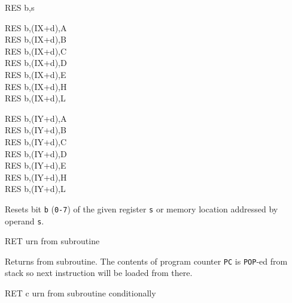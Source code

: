 \documentclass[12pt,twoside,openright,a4paper]{book}
\begin{document}
\begin{basedescript}{
	\desclabelstyle{\multilinelabel}
	\desclabelwidth{3cm}}
\begin{DetailItem}{RES b,s}
\begin{DetailVariants}
			\columnbreak
			RES b,(IX+d),A\UNDOC\\
			RES b,(IX+d),B\UNDOC\\
			RES b,(IX+d),C\UNDOC\\
			RES b,(IX+d),D\UNDOC\\
			RES b,(IX+d),E\UNDOC\\
			RES b,(IX+d),H\UNDOC\\
			RES b,(IX+d),L\UNDOC

			\columnbreak
			RES b,(IY+d),A\UNDOC\\
			RES b,(IY+d),B\UNDOC\\
			RES b,(IY+d),C\UNDOC\\
			RES b,(IY+d),D\UNDOC\\
			RES b,(IY+d),E\UNDOC\\
			RES b,(IY+d),H\UNDOC\\
			RES b,(IY+d),L\UNDOC
		\end{DetailVariants}

		Resets bit {\tt b} ({\tt 0-7}) of the given register {\tt s} or memory location addressed by operand {\tt s}.

		\begin{DetailEffects}
			\FlagsRESr
		\end{DetailEffects}
						
		\begin{DetailTiming}
			\DetailTime[r]{2}{8}
			\DetailTime[(HL)]{4}{15}
			\DetailTime[(IX+d)]{6}{23}
			\DetailTime[(IY+d)]{6}{23}
		\end{DetailTiming}

	\end{DetailItem}

	\pagebreak
	\begin{DetailItem}{RET}
		{urn from subroutine}
		{\SymRET}

		Returns from subroutine. The contents of program counter {\tt PC} is {\tt POP}-ed from stack so next instruction will be loaded from there.

		\begin{DetailEffects}
			\FlagsRET
		\end{DetailEffects}
				
		\begin{DetailTiming}
			\DetailTime{3}{10}
		\end{DetailTiming}

	\end{DetailItem}

	\begin{DetailItem}{RET c}
		{urn from subroutine conditionally}
		{\SymRETc{c}}


\end{DetailItem}
\end{basedescript}
\end{document}
